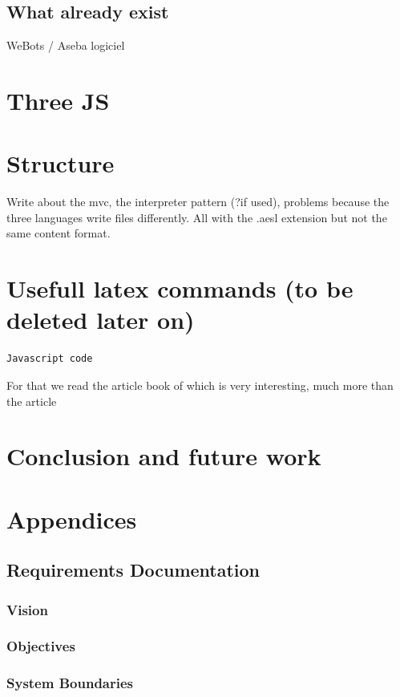 \documentclass{scrartcl}
\begin{document}
\subsection{What already exist} 
WeBots / Aseba logiciel
\section{Three JS}

\section{Structure}
Write about the mvc, the interpreter pattern (?if used), problems because the three languages write files differently. All with the .aesl extension but not the same content format.

\section{Usefull latex commands (to be deleted later on)}
\begin{lstlisting}[style=JavaScript, caption={JavaScript Listing}]
  Javascript code
\end{lstlisting}
For that we read the article book of \cite{Jerald:2015:VBH:2792790}
which is very interesting, much more than the article
\cite{Diniz:2017:UGO:3100317.3100324}

\section{Conclusion and future work}

\section{Appendices}
\subsection{Requirements Documentation}
\subsubsection{Vision}
\subsubsection{Objectives}
\subsubsection{System Boundaries}
\end{document}
